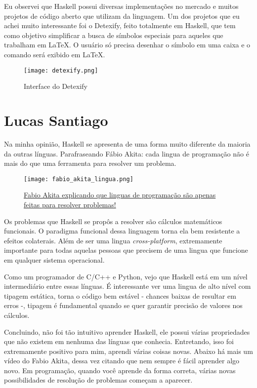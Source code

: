 \begin{apendicesenv}
    Eu observei que Haskell possui diversas implementações no mercado e muitos projetos de código aberto que utilizam da linguagem.
    Um dos projetos que eu achei muito interessante foi o Detexify, feito totalmente em Haskell, que tem como objetivo simplificar a 
    busca de símbolos especiais para aqueles que trabalham em \LaTeX. O usuário só precisa desenhar o símbolo em uma caixa e
    o comando será exibido em \LaTeX.
    
    \begin{figure}[ht]
      \caption{Interface do Detexify}
      \centering
      \texttt{[image: detexify.png]}
    \end{figure}

    \newpage 

    \chapter{Lucas Santiago}

    Na minha opinião, Haskell se apresenta de uma forma muito diferente da maioria da outras línguas. 
    Parafraseando Fábio Akita: cada lingua de programação não é mais do que uma ferramenta
    para resolver um problema.

    \begin{figure}[ht]
      \caption{\href{https://www.youtube.com/watch?v=p9-WuJbVHHc}{Fabio Akita explicando que linguas de programação são apenas feitas para resolver problemas!}}
      \texttt{[image: fabio\_akita\_lingua.png]}
    \end{figure}

    Os problemas que Haskell se propôs a resolver são cálculos matemáticos
    funcionais. O paradigma funcional dessa linguagem torna ela bem resistente a efeitos colaterais. Além de ser uma lingua
    \emph{cross-platform}, extremamente importante para todas aquelas pessoas que precisem de uma lingua que funcione
    em qualquer sistema operacional. 

    Como um programador de C/C++ e Python, vejo que Haskell está em um nível intermediário entre essas línguas.
    É interessante ver uma lingua de alto nível com tipagem estática, torna o código bem estável - chances baixas de 
    resultar em erros -, tipagem é fundamental quando se quer garantir precisão de valores nos cálculos.

    Concluindo, não foi tão intuitivo aprender Haskell, ele possui várias propriedades que não existem em nenhuma das línguas
    que conhecia. Entretando, isso foi extremamente positivo para mim, aprendi várias coisas novas. Abaixo há
    mais um vídeo do Fabio Akita, dessa vez citando que nem sempre é fácil aprender algo novo. Em programação,
    quando você aprende da forma correta, várias novas possibilidades de resolução de problemas começam a aparecer.


\end{apendicesenv}
